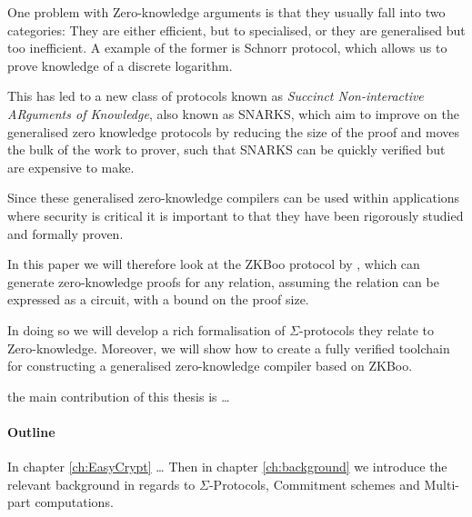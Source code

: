 One problem with Zero-knowledge arguments is that they usually fall into two
categories: They are either efficient, but to specialised, or they are
generalised but too inefficient. A example of the former is Schnorr protocol,
which allows us to prove knowledge of a discrete logarithm.

This has led to a new class of protocols known as \textit{Succinct
  Non-interactive ARguments of Knowledge}, also known as SNARKS, which aim to
improve on the generalised zero knowledge protocols by reducing the size of the
proof and moves the bulk of the work to prover, such that SNARKS can be quickly
verified but are expensive to make.

Since these generalised zero-knowledge compilers can be used within applications
where security is critical it is important to that they have been rigorously
studied and formally proven.

In this paper we will therefore look at the ZKBoo protocol by \citet{zkboo},
which can generate zero-knowledge proofs for any relation, assuming the relation
can be expressed as a circuit, with a bound on the proof size.

In doing so we will develop a rich formalisation of $\Sigma$-protocols they
relate to Zero-knowledge. Moreover, we will show how to create a fully verified
toolchain for constructing a generalised zero-knowledge compiler based on ZKBoo.

the main contribution of this thesis is \dots


\paragraph{Outline}
In chapter \ref{ch:EasyCrypt} \dots
Then in chapter \ref{ch:background} we introduce the relevant background
in regards to $\Sigma$-Protocols, Commitment schemes and Multi-part computations.

